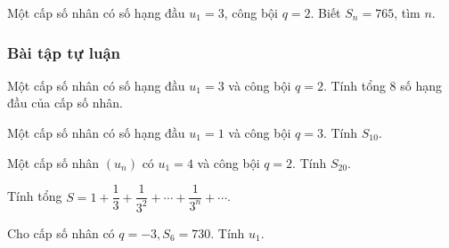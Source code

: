 \begin{vd}[VD]%
	Một cấp số nhân có số hạng đầu $u_1=3$, công bội $q=2$. Biết $S_n=765$, tìm $n$. 
\end{vd}

\subsubsection{Bài tập tự luận}
 
\begin{bt}%
	Một cấp số nhân có số hạng đầu $u_1=3$ và công bội $q=2 $. Tính tổng $8$ số hạng đầu của cấp số nhân.
\end{bt}

\begin{bt}%
	Một cấp số nhân có số hạng đầu $u_1=1$ và công bội $q=3$. Tính $S_{10}.$
\end{bt}

\begin{bt}%
	Một cấp số nhân $(u_n)$ có $u_1=4$ và công bội $q=2$. Tính $S_{20}$.
\end{bt}

\begin{bt}%
	Tính tổng $S=1+\dfrac{1}{3}+\dfrac{1}{3^2}+\cdots+\dfrac{1}{3^n}+\cdots$.
\end{bt}

\begin{bt}%
	Cho cấp số nhân có $q=-3, S_6=730$. Tính $u_1$.
\end{bt}

